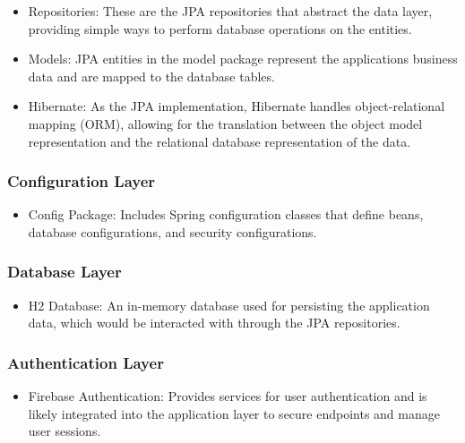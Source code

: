 \begin{itemize}

\item Repositories: These are the JPA repositories that abstract the data layer, providing simple ways to perform database operations on the entities.

\item Models: JPA entities in the model package represent the applications business data and are mapped to the database tables.

\item Hibernate: As the JPA implementation, Hibernate handles object-relational mapping (ORM), allowing for the translation between the object model representation and the relational database representation of the data.

\end{itemize}

\subsubsection{Configuration Layer}

\begin{itemize}

\item Config Package: Includes Spring configuration classes that define beans, database configurations, and security configurations. 

\end{itemize}

\subsubsection{Database Layer}

\begin{itemize}

\item H2 Database: An in-memory database used for persisting the application data, which would be interacted with through the JPA repositories.

\end{itemize}

\subsubsection{Authentication Layer}

\begin{itemize}
    
\item Firebase Authentication: Provides services for user authentication and is likely integrated into the application layer to secure endpoints and manage user sessions.

\end{itemize}

